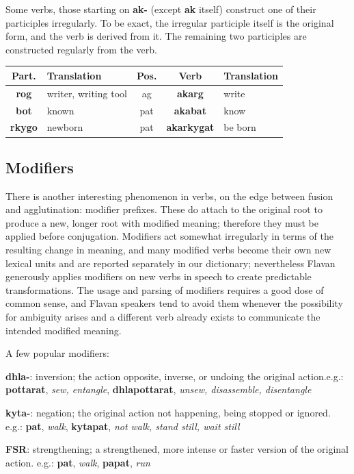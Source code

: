 \documentclass[10pt,oneside]{memoir}
\begin{document}
\begin{multicols}{2}
Some verbs, those starting on \textbf{ak-} (except \textbf{ak} itself) construct one of their participles irregularly. To be exact, the irregular participle itself is the original form, and the verb is derived from it. The remaining two participles are constructed regularly from the verb.

{\small
    \begin{tabular}[]{ c p{1.5cm} c c p{1.5cm} }
    Part. & Translation & Pos. & Verb & Translation\\
    \hline
    \textbf{rog} & writer, writing tool & ag & \textbf{akarg} & write\\
    \textbf{bot} & known                 & pat & \textbf{akabat} & know\\
    \textbf{rkygo} & newborn & pat & \textbf{akarkygat} & be born\\
   
\end{tabular}
}

\subsection{Modifiers}

There is another interesting phenomenon in verbs, on the edge between fusion and agglutination: modifier prefixes. These do attach to the original root to produce a new, longer root with modified meaning; therefore they must be applied before conjugation. Modifiers act somewhat irregularly in terms of the resulting change in meaning, and many modified verbs become their own new lexical units and are reported separately in our dictionary; nevertheless Flavan generously applies modifiers on new verbs in speech to create predictable transformations. The usage and parsing of modifiers requires a good dose of common sense, and Flavan speakers tend to avoid them whenever the possibility for ambiguity arises and a different verb already exists to communicate the intended modified meaning.

A few popular modifiers:

\textbf{dhla-}: inversion; the action opposite, inverse, or undoing the original action.e.g.: \textbf{pottarat}, \emph{sew, entangle}, \textbf{dhlapottarat}, \emph{unsew, disassemble, disentangle}

\textbf{kyta-}: negation; the original action not happening, being stopped or ignored. e.g.: \textbf{pat}, \emph{walk}, \textbf{kytapat}, \emph{not walk, stand still, wait still}

\textbf{FSR}: strengthening; a strengthened, more intense or faster version of the original action. e.g.: \textbf{pat}, \emph{walk}, \textbf{papat}, \emph{run}
		

\end{multicols}
\end{document}
